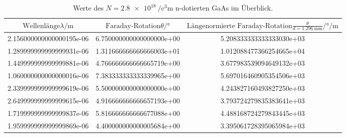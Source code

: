 \begin{table}
  \centering
  \begin{tabular}{S[scientific-notation=fixed, fixed-exponent =-6] S[scientific-notation=fixed, fixed-exponent = 0] S[scientific-notation=fixed, fixed-exponent = 0]}
    \toprule
	    $\text{Wellenlänge} \lambda / \si{\meter}$ & $ \text{Faraday-Rotation} \theta / \si{\degree}$ &$ \text{Längenormierte Faraday-Rotation} \frac{\theta}{d=\SI{1.296}{\milli\meter}} / \si{\degree\per\meter}$ \\
    \midrule
    2.156000000000000195e-06 & 6.750000000000000000e+00 & 5.208333333333333030e+03\\
    1.289999999999999931e-06 & 1.311666666666666003e+01 & 1.012088477366254665e+04\\
    1.449999999999999881e-06 & 4.766666666666665719e+00 & 3.677983539094649132e+03\\
    1.060000000000000016e-06 & 7.383333333333339965e+00 & 5.697016460905354506e+03\\
    2.339999999999999619e-06 & 5.500000000000000000e+00 & 4.243827160493827250e+03\\
    2.649999999999999615e-06 & 4.916666666666657193e+00 & 3.793724279835383641e+03\\
    1.719999999999999837e-06 & 5.816666666666677088e+00 & 4.488168724279843445e+03\\
    1.959999999999999869e-06 & 4.400000000000005684e+00 & 3.395061728395065984e+03\\
    \bottomrule
  \end{tabular}
  \caption{Werte des \texorpdfstring{$N = \SI{2.8e18}{\per\cubic\centi\meter}$}{math} n-dotierten GaAs im Überblick.}
  \label{tab:1.nGaAstab}
\end{table}
